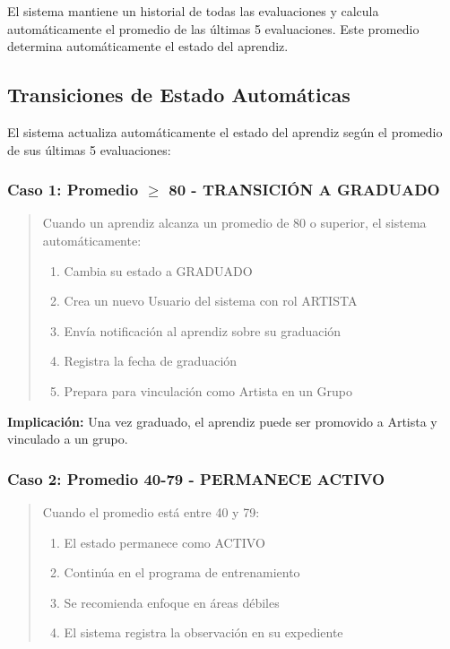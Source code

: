\documentclass[12pt,a4paper,spanish,oneside]{report}
\begin{document}
El sistema mantiene un historial de todas las evaluaciones y calcula automáticamente el promedio de las últimas 5 evaluaciones. Este promedio determina automáticamente el estado del aprendiz.

\subsection{Transiciones de Estado Automáticas}

El sistema actualiza automáticamente el estado del aprendiz según el promedio de sus últimas 5 evaluaciones:

\subsubsection{Caso 1: Promedio $\geq$ 80 - TRANSICIÓN A GRADUADO}

\begin{quote}
Cuando un aprendiz alcanza un promedio de 80 o superior, el sistema automáticamente:

\begin{enumerate}
    \item Cambia su estado a GRADUADO
    \item Crea un nuevo Usuario del sistema con rol ARTISTA
    \item Envía notificación al aprendiz sobre su graduación
    \item Registra la fecha de graduación
    \item Prepara para vinculación como Artista en un Grupo
\end{enumerate}
\end{quote}

\textbf{Implicación:} Una vez graduado, el aprendiz puede ser promovido a Artista y vinculado a un grupo.

\subsubsection{Caso 2: Promedio 40-79 - PERMANECE ACTIVO}

\begin{quote}
Cuando el promedio está entre 40 y 79:

\begin{enumerate}
    \item El estado permanece como ACTIVO
    \item Continúa en el programa de entrenamiento
    \item Se recomienda enfoque en áreas débiles
    \item El sistema registra la observación en su expediente
\end{enumerate}
\end{quote}
\end{document}
